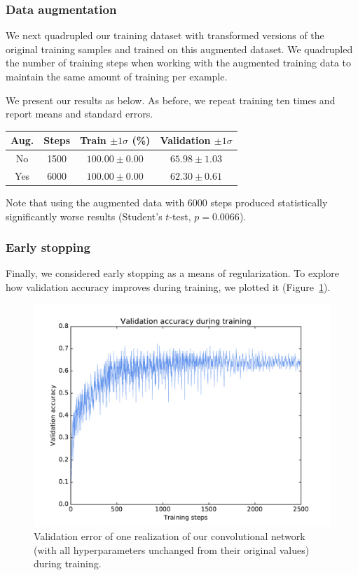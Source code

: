 \documentclass{article}
\begin{document}
\begin{multicols}{2}
\subsubsection{Data augmentation}

We next quadrupled our training dataset
with transformed versions of the original training samples
and trained on this augmented dataset.
We quadrupled the number of training steps
when working with the augmented training data
to maintain the same amount of training per example.

We present our results as below.
As before, we repeat training ten times
and report means and standard errors.
\begin{center}
    \begin{tabular}{cc|cc}
        Aug. & Steps & Train $\pm 1 \sigma$ (\%) & Validation $\pm 1 \sigma$\\\hline
        No  & 1500 & $100.00 \pm 0.00$ & $65.98 \pm 1.03$ \\
        Yes & 6000 & $100.00 \pm 0.00$ & $62.30 \pm 0.61$
    \end{tabular}
\end{center}
Note that using the augmented data with 6000 steps
produced statistically significantly worse results
(Student's $t$-test, $p=0.0066$).

\subsubsection{Early stopping}

Finally, we considered early stopping as a means of regularization.
To explore how validation accuracy improves during training,
we plotted it (Figure~\ref{fig:2-4-4-validation-acc}).

\begin{figure}[t]
   \centering
   \includegraphics[width=4.5in]{img/2-4-4-validation-acc-new.pdf}
   \caption{Validation error of one realization of our convolutional network
   (with all hyperparameters unchanged from their original values)
   during training.}
   \label{fig:2-4-4-validation-acc}
\end{figure}


\end{multicols}
\end{document}
